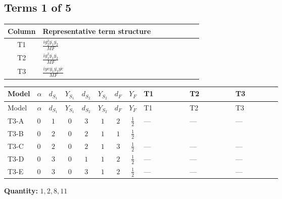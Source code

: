 \documentclass[8pt]{article}
\begin{document}
\begin{landscape}
\subsection*{Terms 1 of 5}
\begin{center}
\begin{tabular}{@{}c >{\raggedright\arraybackslash}p{0.82\linewidth}@{}}
\toprule
Column & Representative term structure \\
\midrule
T1 & \(\displaystyle \frac{i g_{2}^{2} \overline{y_{1}} \overline{y_{2}}}{MF}\) \\
\midrule
T2 & \(\displaystyle \frac{i g_{1}^{2} \overline{y_{1}} \overline{y_{2}}}{MF}\) \\
\midrule
T3 & \(\displaystyle \frac{i ye \overline{y_{1}} \overline{y_{2}} \overline{ye}}{MF}\) \\
\midrule
\bottomrule
\end{tabular}
\end{center}
\smallskip
\tiny
\begin{longtable}{@{}llcccccc >{\raggedright\arraybackslash}p{0.21\linewidth} >{\raggedright\arraybackslash}p{0.21\linewidth} >{\raggedright\arraybackslash}p{0.21\linewidth}@{}}
\toprule
Model & $\alpha$ & $d_{S_1}$ & $Y_{S_1}$ & $d_{S_2}$ & $Y_{S_2}$ & $d_F$ & $Y_F$ & T1 & T2 & T3 \\
\midrule
\endfirsthead
\toprule
Model & $\alpha$ & $d_{S_1}$ & $Y_{S_1}$ & $d_{S_2}$ & $Y_{S_2}$ & $d_F$ & $Y_F$ & T1 & T2 & T3 \\
\midrule
\endhead
T3-A & $0$ & $1$ & $0$ & $3$ & $1$ & $2$ & $\frac{1}{2}$ & --- & --- & --- \\
\midrule
T3-B & $0$ & $2$ & $0$ & $2$ & $1$ & $1$ & $\frac{1}{2}$ & \scriptsize\adjustbox{max width=\linewidth}{$\begin{gathered} \frac{3 i g_{2}^{2} \overline{y_{1}} \overline{y_{2}}}{8 MF}\end{gathered}$} & \scriptsize\adjustbox{max width=\linewidth}{$\begin{gathered} \frac{3 i g_{1}^{2} \overline{y_{1}} \overline{y_{2}}}{16 MF}\end{gathered}$} & \scriptsize\adjustbox{max width=\linewidth}{$\begin{gathered} - \frac{i ye \overline{y_{1}} \overline{y_{2}} \overline{ye}}{8 MF}\end{gathered}$} \\
\midrule
T3-C & $0$ & $2$ & $0$ & $2$ & $1$ & $3$ & $\frac{1}{2}$ & --- & --- & --- \\
\midrule
T3-D & $0$ & $3$ & $0$ & $1$ & $1$ & $2$ & $\frac{1}{2}$ & --- & --- & --- \\
\midrule
T3-E & $0$ & $3$ & $0$ & $3$ & $1$ & $2$ & $\frac{1}{2}$ & --- & --- & --- \\
\midrule
\bottomrule
\end{longtable}
\clearpage
\noindent\textbf{Quantity: }$\mathrm{1,2,8,11}$\par\smallskip

\end{landscape}
\end{document}
